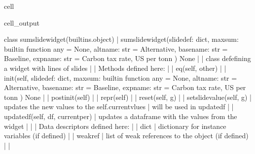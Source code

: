 \documentclass[letterpaper,10pt,english]{jupyterBook}
\begin{document}
\begin{sphinxuseclass}{cell}
\begin{sphinxVerbatimOutput}
\begin{sphinxuseclass}{cell_output}
\begin{sphinxVerbatim}[commandchars=\\\{\}]
    class sumslidewidget(builtins.object)
     |  sumslidewidget(slidedef: dict, maxsum: \PYGZlt{}built\PYGZhy{}in function any\PYGZgt{} = None, altname: str = \PYGZsq{}Alternative\PYGZsq{}, basename: str = \PYGZsq{}Baseline\PYGZsq{}, expname: str = \PYGZsq{}Carbon tax rate, US\PYGZdl{} per tonn \PYGZsq{}) \PYGZhy{}\PYGZgt{} None
     |  
     |  class defefining a widget with lines of slides
     |  
     |  Methods defined here:
     |  
     |  \PYGZus{}\PYGZus{}eq\PYGZus{}\PYGZus{}(self, other)
     |  
     |  \PYGZus{}\PYGZus{}init\PYGZus{}\PYGZus{}(self, slidedef: dict, maxsum: \PYGZlt{}built\PYGZhy{}in function any\PYGZgt{} = None, altname: str = \PYGZsq{}Alternative\PYGZsq{}, basename: str = \PYGZsq{}Baseline\PYGZsq{}, expname: str = \PYGZsq{}Carbon tax rate, US\PYGZdl{} per tonn \PYGZsq{}) \PYGZhy{}\PYGZgt{} None
     |  
     |  \PYGZus{}\PYGZus{}post\PYGZus{}init\PYGZus{}\PYGZus{}(self)
     |  
     |  \PYGZus{}\PYGZus{}repr\PYGZus{}\PYGZus{}(self)
     |  
     |  reset(self, g)
     |  
     |  set\PYGZus{}slide\PYGZus{}value(self, g)
     |      updates the new values to the self.current\PYGZus{}vlues
     |      will be used in update\PYGZus{}df
     |  
     |  update\PYGZus{}df(self, df, current\PYGZus{}per)
     |      updates a dataframe with the values from the widget
     |  
     |  \PYGZhy{}\PYGZhy{}\PYGZhy{}\PYGZhy{}\PYGZhy{}\PYGZhy{}\PYGZhy{}\PYGZhy{}\PYGZhy{}\PYGZhy{}\PYGZhy{}\PYGZhy{}\PYGZhy{}\PYGZhy{}\PYGZhy{}\PYGZhy{}\PYGZhy{}\PYGZhy{}\PYGZhy{}\PYGZhy{}\PYGZhy{}\PYGZhy{}\PYGZhy{}\PYGZhy{}\PYGZhy{}\PYGZhy{}\PYGZhy{}\PYGZhy{}\PYGZhy{}\PYGZhy{}\PYGZhy{}\PYGZhy{}\PYGZhy{}\PYGZhy{}\PYGZhy{}\PYGZhy{}\PYGZhy{}\PYGZhy{}\PYGZhy{}\PYGZhy{}\PYGZhy{}\PYGZhy{}\PYGZhy{}\PYGZhy{}\PYGZhy{}\PYGZhy{}\PYGZhy{}\PYGZhy{}\PYGZhy{}\PYGZhy{}\PYGZhy{}\PYGZhy{}\PYGZhy{}\PYGZhy{}\PYGZhy{}\PYGZhy{}\PYGZhy{}\PYGZhy{}\PYGZhy{}\PYGZhy{}\PYGZhy{}\PYGZhy{}\PYGZhy{}\PYGZhy{}\PYGZhy{}\PYGZhy{}\PYGZhy{}\PYGZhy{}\PYGZhy{}\PYGZhy{}
     |  Data descriptors defined here:
     |  
     |  \PYGZus{}\PYGZus{}dict\PYGZus{}\PYGZus{}
     |      dictionary for instance variables (if defined)
     |  
     |  \PYGZus{}\PYGZus{}weakref\PYGZus{}\PYGZus{}
     |      list of weak references to the object (if defined)
     |  
     |  \PYGZhy{}\PYGZhy{}\PYGZhy{}\PYGZhy{}\PYGZhy{}\PYGZhy{}\PYGZhy{}\PYGZhy{}\PYGZhy{}\PYGZhy{}\PYGZhy{}\PYGZhy{}\PYGZhy{}\PYGZhy{}\PYGZhy{}\PYGZhy{}\PYGZhy{}\PYGZhy{}\PYGZhy{}\PYGZhy{}\PYGZhy{}\PYGZhy{}\PYGZhy{}\PYGZhy{}\PYGZhy{}\PYGZhy{}\PYGZhy{}\PYGZhy{}\PYGZhy{}\PYGZhy{}\PYGZhy{}\PYGZhy{}\PYGZhy{}\PYGZhy{}\PYGZhy{}\PYGZhy{}\PYGZhy{}\PYGZhy{}\PYGZhy{}\PYGZhy{}\PYGZhy{}\PYGZhy{}\PYGZhy{}\PYGZhy{}\PYGZhy{}\PYGZhy{}\PYGZhy{}\PYGZhy{}\PYGZhy{}\PYGZhy{}\PYGZhy{}\PYGZhy{}\PYGZhy{}\PYGZhy{}\PYGZhy{}\PYGZhy{}\PYGZhy{}\PYGZhy{}\PYGZhy{}\PYGZhy{}\PYGZhy{}\PYGZhy{}\PYGZhy{}\PYGZhy{}\PYGZhy{}\PYGZhy{}\PYGZhy{}\PYGZhy{}\PYGZhy{}\PYGZhy{}

\end{sphinxVerbatim}
\end{sphinxuseclass}
\end{sphinxVerbatimOutput}
\end{sphinxuseclass}
\end{document}
